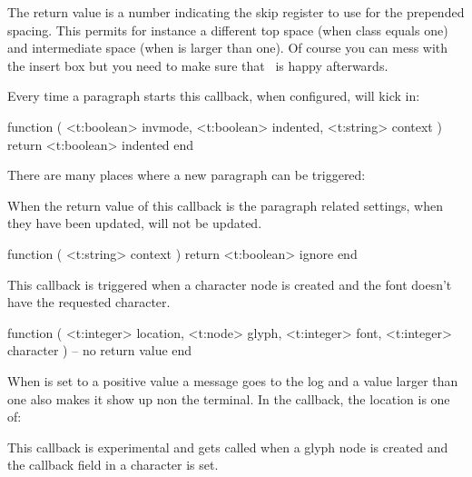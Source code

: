 The return value is a number indicating the skip register to use for the
prepended spacing. This permits for instance a different top space (when \type
{class} equals one) and intermediate space (when  is larger than
one). Of course you can mess with the insert box but you need to make sure that
\LUATEX\ is happy afterwards.

\stopsubsection

\startsubsection[title=begin_paragraph]

Every time a paragraph starts this callback, when configured, will kick in:

\starttyping[option=LUA]
function (
    <t:boolean> invmode,
    <t:boolean> indented,
    <t:string>  context
)
    return <t:boolean> indented
end
\stoptyping

There are many places where a new paragraph can be triggered:

\startfourrows
{}
\stopfourrows

\stopsubsection

\startsubsection[title=paragraph_context]

When the return value of this callback is  the paragraph related
settings, when they have been updated, will not be updated.

\starttyping[option=LUA]
function (
    <t:string> context
)
    return <t:boolean> ignore
end
\stoptyping

\stopsubsection

\startsubsection[title=missing_character]

This callback is triggered when a character node is created and the font doesn't
have the requested character.

\starttyping[option=LUA]
function (
    <t:integer> location,
    <t:node>    glyph,
    <t:integer> font,
    <t:integer> character
)
    -- no return value
end
\stoptyping

When  is set to a positive value a message goes to the log
and a value larger than one also makes it show up non the terminal. In the
callback, the location is one of:

\startfourrows
{}
\stopfourrows

\stopsubsection

\startsubsection[title=process_character]

This callback is experimental and gets called when a glyph node is created and
the callback field in a character is set.

